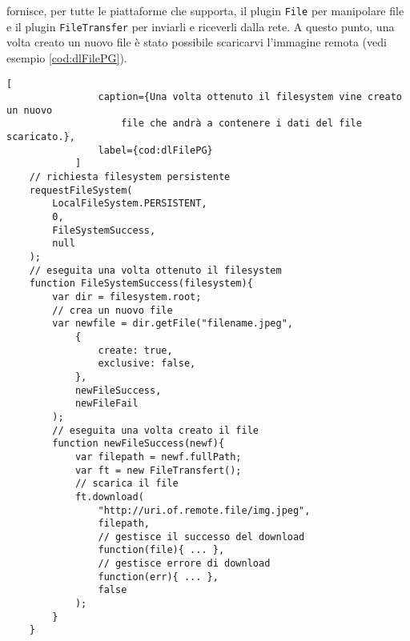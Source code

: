 			\pg{} fornisce, per tutte le piattaforme che supporta, il plugin 
			\texttt{File} per manipolare file e il plugin \texttt{FileTransfer} 
			per inviarli e riceverli dalla rete. A questo punto, una volta 
			creato un nuovo file è stato possibile scaricarvi l'immagine remota 
			(vedi esempio \ref{cod:dlFilePG}).
			\begin{lstlisting}[
				caption={Una volta ottenuto il filesystem vine creato un nuovo 
					file che andrà a contenere i dati del file scaricato.},
				label={cod:dlFilePG}
			]
	// richiesta filesystem persistente
	requestFileSystem(
		LocalFileSystem.PERSISTENT,
		0,
		FileSystemSuccess,
		null
	);
	// eseguita una volta ottenuto il filesystem
	function FileSystemSuccess(filesystem){
		var dir = filesystem.root;
		// crea un nuovo file
		var newfile = dir.getFile("filename.jpeg",
			{
				create: true,
				exclusive: false,
			},
			newFileSuccess,
			newFileFail
		);
		// eseguita una volta creato il file
		function newFileSuccess(newf){
			var filepath = newf.fullPath;
			var ft = new FileTransfert();		
			// scarica il file
			ft.download(
				"http://uri.of.remote.file/img.jpeg",
				filepath,
				// gestisce il successo del download
				function(file){ ... },
				// gestisce errore di download
				function(err){ ... },
				false
			);
		}
	}
			\end{lstlisting}
			
